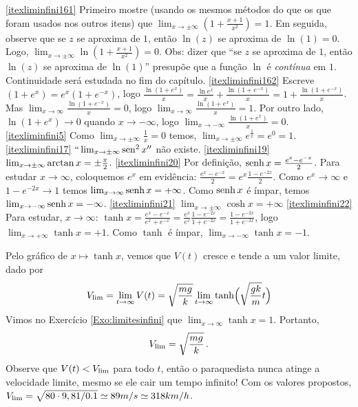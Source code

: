 \begin{Solution}{4.7}
\eqref{itexliminfini161}  Primeiro mostre (usando os mesmos métodos do que os que foram
usados nos outros itens) que $\lim_{x\to \pm \infty}(1+\frac{x+1}{x^2})=1$. Em seguida,
observe que
se $z$ se aproxima de $1$,  então $\ln(z)$ se aproxima de $\ln(1)=0$. Logo, $\lim_{x\to
\pm \infty}\ln(1+\frac{x+1}{x^2})=0$. Obs: dizer que ``se $z$ se aproxima de $1$, então
$\ln(z)$ se aproxima de $\ln(1)$'' presupõe que a função $\ln$ é \emph{contínua} em $1$.
Continuidade será estudada no fim do capítulo.
\eqref{itexliminfini162}  Escreve $(1+e^x)=e^x(1+e^{-x})$, logo
$\frac{\ln(1+e^x)}{x}=\frac{\ln
e^x}{x}+\frac{\ln(1+e^{-x})}{x}=1+\frac{\ln(1+e^{-x})}{x}$. Mas $\lim_{x\to
\infty}\frac{\ln(1+e^{-x})}{x}=0$, logo
$\lim_{x\to \infty}\frac{\ln(1+e^{x})}{x}=1$.
Por outro lado, $\ln(1+e^x)\to 0$  quando $x\to-\infty$, logo $\lim_{x\to
-\infty}\frac{\ln(1+e^{x})}{x}=0$.
\eqref{itexliminfini5} Como $\lim_{x\to\pm \infty}\frac{1}{x}=0$
temos, $\lim_{x\to\pm \infty}e^{\frac{1}{x}}=e^0=1$.
\eqref{itexliminfini17} $``\lim_{x\to \pm\infty}\operatorname{sen}^2x''$ não existe.
\eqref{itexliminfini19} $\lim_{x\to \pm\infty}\arctan
x=\pm\tfrac{\pi}{2}$.
\eqref{itexliminfini20}
Por definição, $\operatorname{senh} x=\frac{e^x-e^{-x}}{2}$. Para estudar
$x\to\infty$, coloquemos $e^x$ em evidência:
$\frac{e^x-e^{-x}}{2}=e^x\frac{1-e^{-2x}}{2}$. Como $e^x\to\infty$ e
$1-e^{-2x}\to 1$ temos $\lim_{x\to \infty}\operatorname{senh} x=+\infty$. Como
$\operatorname{senh} x$ é ímpar, temos $\lim_{x\to -\infty}\operatorname{senh} x=-\infty$.
\eqref{itexliminfini21} $\lim_{x\to \pm\infty}\cosh x=+\infty$
\eqref{itexliminfini22} Para estudar, $x\to\infty$:
$\tanh x=\frac{e^x-e^{-x}}{e^x+e^{-x}}=\frac{e^x}{e^x}\frac{1-e^{-2x}}{1+e^{
-2x }}=\frac{1-e^{-2x}}{1+e^{
-2x }}$, logo $\lim_{x\to +\infty}\tanh x=+1$. Como $\tanh$ é ímpar,
$\lim_{x\to -\infty}\tanh x=-1$.
\end{Solution}
\begin{Solution}{4.8}
Pelo gráfico de $x\mapsto \tanh x$, vemos que $V(t)$ cresce e tende a
um valor limite, dado por
$$
V_{\rm lim}=\lim_{t\to\infty}V(t)=\sqrt{\frac{m
g}{k}}\lim_{t\to\infty}\tanh\Bigl(\sqrt{\frac{gk}{m}}t\Bigr)
$$
Vimos no Exercício \ref{Exo:limitesinfini} que
$\lim_{x\to\infty}\tanh x=1$. Portanto,
$$V_{\rm lim}=\sqrt{\frac{m
g}{k}}\,.$$
Observe que $V(t)<V_{\rm lim}$ para todo $t$, então o paraquedista
nunca atinge a velocidade limite, mesmo se ele cair um tempo infinito!
Com os valores propostos,
$V_{\rm lim}=\sqrt{80\cdot 9,81/0.1}\simeq 89m/s\simeq 318km/h$.
\end{Solution}
